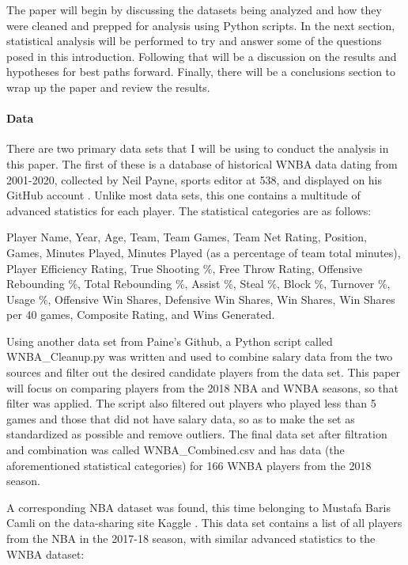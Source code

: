 \documentclass[12pt]{article}
\begin{document}
\par
The paper will begin by discussing the datasets being analyzed and how they were cleaned and prepped for analysis using Python scripts. In the next section, statistical analysis will be performed to try and answer some of the questions posed in this introduction. Following that will be a discussion on the results and hypotheses for best paths forward. Finally, there will be a conclusions section to wrap up the paper and review the results.


\paragraph{Data}
There are two primary data sets that I will be using to conduct the analysis in this paper. The first of these is a database of historical WNBA data dating from 2001-2020, collected by Neil Payne, sports editor at 538, and displayed on his GitHub account \cite{first}. Unlike most data sets, this one contains a multitude of advanced statistics for each player. The statistical categories are as follows:
\newline
\par
Player Name, Year, Age, Team, Team Games, Team Net Rating, Position, Games, Minutes Played, Minutes Played (as a percentage of team total minutes), Player Efficiency Rating, True Shooting \%, Free Throw Rating, Offensive Rebounding \%, Total Rebounding \%, Assist \%, Steal \%, Block \%, Turnover \%, Usage \%, Offensive Win Shares, Defensive Win Shares, Win Shares, Win Shares per 40 games, Composite Rating, and Wins Generated.
\newline
\par
Using another data set from Paine’s Github, a Python script called WNBA\_Cleanup.py was written and used to combine salary data from the two sources and filter out the desired candidate players from the data set. This paper will focus on comparing players from the 2018 NBA and WNBA seasons, so that filter was applied. The script also filtered out players who played less than 5 games and those that did not have salary data, so as to make the set as standardized as possible and remove outliers. The final data set after filtration and combination was called WNBA\_Combined.csv and has data (the aforementioned statistical categories) for 166 WNBA players from the 2018 season.
\par
A corresponding NBA dataset was found, this time belonging to Mustafa Baris Camli on the data-sharing site Kaggle \cite{nba}. This data set contains a list of all players from the NBA in the 2017-18 season, with similar advanced statistics to the WNBA dataset:
\end{document}
